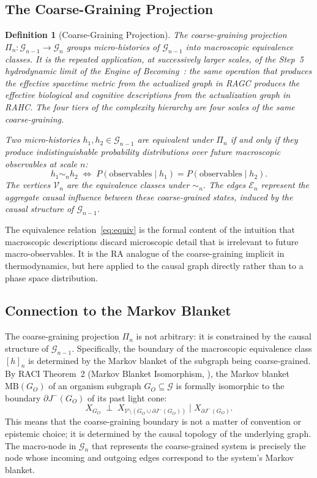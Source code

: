 \documentclass[11pt,a4paper]{article}
\newtheorem{definition}[theorem]{Definition}
\theoremstyle{remark}
\newcommand{\MB}{\mathrm{MB}}
\newcommand{\GG}{\mathcal{G}}
\newcommand{\VV}{\mathcal{V}}
\newcommand{\EE}{\mathcal{E}}
\begin{document}
\subsection{The Coarse-Graining Projection}

\begin{definition}[Coarse-Graining Projection]
The coarse-graining projection $\Pi_n : \GG_{n-1} \to \GG_n$ groups micro-histories
of $\GG_{n-1}$ into macroscopic equivalence classes. It is the repeated application,
at successively larger scales, of the Step~5 hydrodynamic limit of the Engine of
Becoming~\citep{Sandeman2026RAEB}: the same operation that produces the effective
spacetime metric from the actualized graph in RAGC produces the effective
biological and cognitive descriptions from the actualization graph in RAHC. The
four tiers of the complexity hierarchy are four scales of the same coarse-graining.

Two micro-histories $h_1, h_2 \in \GG_{n-1}$ are equivalent under $\Pi_n$ if and
only if they produce indistinguishable probability distributions over future
macroscopic observables at scale $n$:
\begin{equation}
  h_1 \sim_n h_2
  \;\iff\;
  P(\text{observables} \mid h_1) = P(\text{observables} \mid h_2).
  \label{eq:equiv}
\end{equation}
The vertices $\VV_n$ are the equivalence classes under $\sim_n$. The edges
$\EE_n$ represent the aggregate causal influence between these coarse-grained states,
induced by the causal structure of $\GG_{n-1}$.
\end{definition}

The equivalence relation~\eqref{eq:equiv} is the formal content of the intuition
that macroscopic descriptions discard microscopic detail that is irrelevant to
future macro-observables. It is the RA analogue of the coarse-graining implicit in
thermodynamics, but here applied to the causal graph directly rather than to a
phase space distribution.

\subsection{Connection to the Markov Blanket}

The coarse-graining projection $\Pi_n$ is not arbitrary: it is constrained by the
causal structure of $\GG_{n-1}$. Specifically, the boundary of the macroscopic
equivalence class $[h]_n$ is determined by the Markov blanket of the subgraph
being coarse-grained. By RACI Theorem~2 (Markov Blanket Isomorphism,
\citep{Sandeman2026c}), the Markov blanket $\MB(G_O)$ of an organism subgraph
$G_O \subseteq \GG$ is formally isomorphic to the boundary $\partial J^-(G_O)$
of its past light cone:
\begin{equation}
  X_{G_O} \;\perp\; X_{\VV \setminus (G_O \cup \partial J^-(G_O))}
  \;\Big|\; X_{\partial J^-(G_O)}.
\end{equation}
This means that the coarse-graining boundary is not a matter of convention or
epistemic choice; it is determined by the causal topology of the underlying graph.
The macro-node in $\GG_n$ that represents the coarse-grained system is precisely
the node whose incoming and outgoing edges correspond to the system's Markov
blanket.
\end{document}

